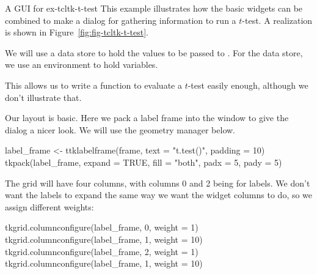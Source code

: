 \begin{example}{A GUI for }{ex-tcltk-t-test}
This example illustrates how the basic widgets can be combined to make
a dialog for gathering information to run a $t$-test. A realization is
shown in Figure~\ref{fig:fig-tcltk-t-test}.






We will use a data store to hold the values to be passed to
. For the data store, we  use an environment to hold \Tcl\/ variables.

\begin{Schunk}
\end{Schunk}

This allows us to write a function to evaluate a $t$-test easily
enough, although we don't illustrate that.






Our layout is basic. Here we pack a label frame into the window to give the dialog a nicer look.
We will use the  geometry manager below.
\begin{Schunk}
\begin{Sinput}
 label_frame <- ttklabelframe(frame, text = "t.test()", padding = 10)
 tkpack(label_frame, expand = TRUE, fill = "both", padx = 5, pady = 5)
\end{Sinput}
\end{Schunk}

The grid will have four columns, with columns 0 and 2 being for labels.
We don't want the labels to expand the same way we want the widget columns to do, so we
assign different weights:
\begin{Schunk}
\begin{Sinput}
 tkgrid.columnconfigure(label_frame, 0, weight = 1)
 tkgrid.columnconfigure(label_frame, 1, weight = 10)
 tkgrid.columnconfigure(label_frame, 2, weight = 1)
 tkgrid.columnconfigure(label_frame, 1, weight = 10)
\end{Sinput}
\end{Schunk}



\end{example}
